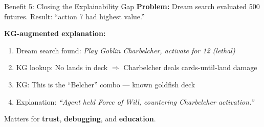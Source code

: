 \documentclass[aspectratio=169, 11pt]{beamer}
\begin{document}
\begin{frame}{Benefit 5: Closing the Explainability Gap}
  \textbf{Problem:} Dream search evaluated 500 futures.
  Result: ``action 7 had highest value.''
  \vspace{0.3cm}

  \textbf{KG-augmented explanation:}
  \begin{enumerate}\small
    \item Dream search found: \textit{Play Goblin Charbelcher, activate for 12 (lethal)}
    \item KG lookup: No lands in deck $\Rightarrow$ Charbelcher deals
          cards-until-land damage
    \item KG: This is the ``Belcher'' combo --- known goldfish deck
    \item Explanation: \textit{``Agent held Force of Will,
          countering Charbelcher activation.''}
  \end{enumerate}
  \vspace{0.3cm}

  \begin{center}
    Matters for \textbf{trust}, \textbf{debugging}, and \textbf{education}.
  \end{center}
\end{frame}
\end{document}
